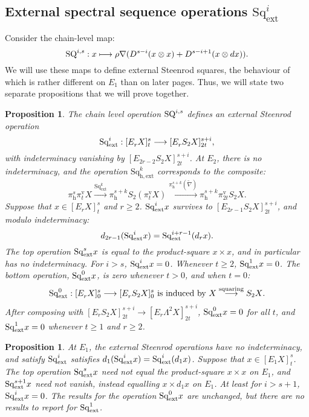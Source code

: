 \documentclass[11pt]{amsart} \renewcommand{\baselinestretch}{1.2}
\theoremstyle{plain}
\newtheorem{prop}[thm]{Proposition}
\theoremstyle{definition}
\renewcommand{\to}{\longrightarrow}
\newcommand{\ExtCohOp}{\mathrm{Sq}_\mathrm{ext}}
\newcommand{\hExtCohOp}{\mathrm{Sq}_\mathrm{h,ext}}
\newcommand{\Nabla}{\nabla}
\newcommand{\Sq}{\mathrm{Sq}}
\newcommand{\Edownup}[5]{[E_{#1}^{#2}#3]^{#4}_{#5}}
\newcommand{\uver}{^\mathrm{v}}
\newcommand{\dhor}{_\mathrm{h}}
\renewcommand{\mapsto}{\longmapsto}
\begin{document}
\begin{second quadrant homotopy sseq operations}
\subsection{External spectral sequence operations $\Sq_\mathrm{ext}^i$}
\label{External spectral sequence operations Sq}
Consider the chain-level map:
\[\textup{SQ}^{i,s}:x\mapsto \rho\Nabla (D^{s-i}(x\otimes x)+D^{s-i+1}(x\otimes dx)).\]
We will use these maps to define external Steenrod squares, the behaviour of which is rather different on $E_1$ than on later pages. Thus, we will state two separate propositions that we will prove together.
\begin{prop}
\label{prop on e1 steens 1}
The chain level operation $\textup{SQ}^{i,s}$ defines an \emph{external Steenrod operation} \[\Sq^i_\textup{ext}:\Edownup{r}{}{X}{s}{t}\to \Edownup{r}{}{S_2X}{s+i}{2t},\] with indeterminacy vanishing by $\Edownup{2r-2}{}{S_2X}{s+i}{2t}$. At $E_2$, there is no indeterminacy, and the operation $\hExtCohOp^k$ corresponds to the composite:
\[\pi\dhor^s\pi\uver_t X
\overset{\ExtCohOp^k}{\to} 
\pi\dhor^{s+k}S_2(\pi\uver_t X)
\overset{\pi\dhor^{s+k}(\widetilde{\nabla})}{\to}
\pi\dhor^{s+k}\pi\uver_{2t}S_2 X.
\]
Suppose that $x\in \Edownup{r}{}{X}{s}{t}$ and $r\geq2$. $\Sq^i_\textup{ext}x$ survives to $\Edownup{2r-1}{}{S_2X}{s+i}{2t}$, and modulo indeterminacy: \[d_{2r-1}(\Sq^i_\textup{ext}x)=\Sq^{i+r-1}_\textup{ext}(d_rx).\]
The top operation $\Sq^s_\textup{ext}x$ is equal to the product-square $x\times x$, and in particular has no indeterminacy. For $i>s$, $\Sq^i_\textup{ext}x=0$. Whenever $t\geq2$, $\Sq^1_\textup{ext}x=0$.  The bottom operation, $\Sq^0_\textup{ext}x$, is zero whenever $t>0$, and when $t=0$:
\[\Sq^0_\textup{ext}:\Edownup{r}{}{X}{s}{0}\to \Edownup{r}{}{S_2X}{s}{0}\textup{ is induced by $X\overset{\textup{squaring}}{\to}S_2X$}.\]
After composing with $\Edownup{r}{}{S_2X}{s+i}{2t}\to \Edownup{r}{}{\Lambda^2X}{s+i}{2t}$, $\Sq^0_\textup{ext}x=0$ for all $t$, and $\Sq^1_\textup{ext}x=0$ whenever $t\geq1$ and $r\geq2$.
\end{prop}


\begin{prop}
\label{prop on e1 steens 2}
At $E_1$, the external Steenrod operations have no indeterminacy, and satisfy $\Sq^i_\textup{ext}$ satisfies $d_{1}(\Sq^i_\textup{ext}x)=\Sq^{i}_\textup{ext}(d_1x)$. Suppose that $x\in \Edownup{1}{}{X}{s}{t}$.
The top operation $\Sq^s_\textup{ext}x$ \emph{need not} equal the product-square $x\times x$ on $E_1$, and
$\Sq^{s+1}_\textup{ext}x$ \emph{need not} vanish, instead equalling $x\times d_1x$ on $E_1$.
At least for $i>s+1$, $\Sq^i_\textup{ext}x=0$. The results for the operation $\Sq^0_\textup{ext}x$ are unchanged, but there are no results to report for $\Sq^{1}_\textup{ext}$.
\end{prop}




\end{second quadrant homotopy sseq operations}
\end{document}
